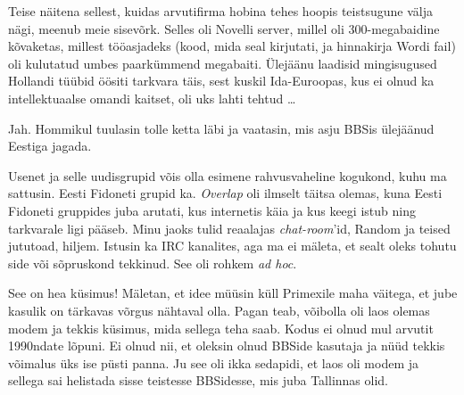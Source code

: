 Teise näitena sellest, kuidas arvutifirma hobina tehes hoopis 
teistsugune välja nägi, meenub meie sisevõrk. Selles oli Novelli server, 
millel oli 300-megabaidine kõvaketas, millest 
tööasjadeks (kood, mida seal 
kirjutati, ja hinnakirja Wordi fail) oli kulutatud umbes paarkümmend megabaiti. Ülejäänu laadisid 
mingisugused Hollandi tüübid öösiti tarkvara täis, sest 
kuskil Ida-Euroopas, kus ei olnud ka intellektuaalse 
omandi kaitset, oli uks lahti tehtud \ldots


Jah. Hommikul tuulasin tolle ketta läbi ja vaatasin, mis asju BBSis ülejäänud 
Eestiga jagada.


Usenet ja selle uudisgrupid võis olla esimene rahvusvaheline
kogukond, kuhu ma sattusin. Eesti Fidoneti grupid ka. \emph{Overlap} oli ilmselt täitsa olemas, kuna Eesti Fidoneti 
gruppides juba arutati, kus internetis käia ja kus keegi istub ning tarkvarale 
ligi pääseb. Minu jaoks tulid reaalajas 
\emph{chat-room}'id, Random ja teised 
jututoad, hiljem. Istusin ka IRC kanalites, aga ma ei mäleta, et sealt 
oleks tohutu side või sõpruskond tekkinud. See oli rohkem 
\emph{ad hoc}. 


See on hea küsimus! Mäletan, et idee müüsin küll Primexile maha väitega, 
et jube kasulik on tärkavas võrgus nähtaval olla. Pagan teab, võibolla oli 
laos olemas modem ja tekkis küsimus, mida sellega teha saab. 
Kodus ei olnud mul arvutit 1990ndate lõpuni. Ei olnud nii, et 
oleksin olnud BBSide kasutaja ja nüüd tekkis võimalus üks ise püsti panna. 
Ju see oli ikka sedapidi, et laos oli modem ja sellega sai helistada sisse 
teistesse BBSidesse, mis juba Tallinnas olid.

